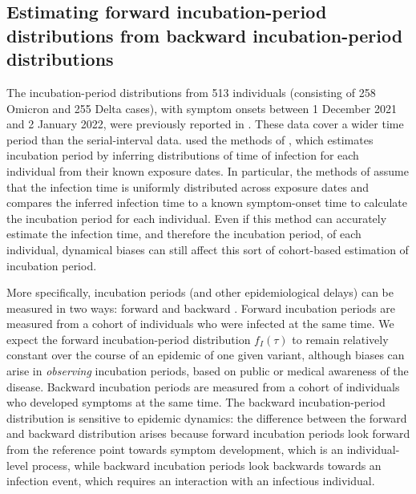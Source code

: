 \documentclass[12pt]{article}
\begin{document}
\subsection{Estimating forward incubation-period distributions from backward incubation-period distributions}

The incubation-period distributions from 513 individuals (consisting of 258 Omicron and 255 Delta cases), with symptom onsets between 1 December 2021 and 2 January 2022, were previously reported in \cite{backer2021omicron}.
These data cover a wider time period than the serial-interval data.
\cite{backer2021omicron} used the methods of \cite{backer2020incubation}, which estimates incubation period by inferring distributions of time of infection for each individual from their known exposure dates.
In particular, the methods of \cite{backer2020incubation} assume that the infection time is uniformly distributed across exposure dates and compares the inferred infection time to a known symptom-onset time to calculate the incubation period for each individual.
Even if this method can accurately estimate the infection time, and therefore the incubation period, of each individual, dynamical biases can still affect this sort of cohort-based estimation of incubation period.

More specifically, incubation periods (and other epidemiological delays) can be measured in two ways: forward and backward \citep{park2021forward}.
Forward incubation periods are measured from a cohort of individuals who were infected at the same time. 
We expect the forward incubation-period distribution $f_I(\tau)$ to remain relatively constant over the course of an epidemic of one given variant, although biases can arise in \emph{observing} incubation periods, based on public or medical awareness of the disease. 
Backward incubation periods are measured from a cohort of individuals who developed symptoms at the same time. 
The backward incubation-period distribution is sensitive to epidemic dynamics:
the difference between the forward and backward distribution arises because forward incubation periods look forward from the reference point towards symptom development, which is an individual-level process, while backward incubation periods look backwards towards an infection event, which requires an interaction with an infectious individual.
\end{document}
